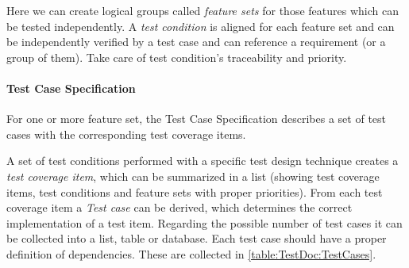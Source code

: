 Here we can create logical groups called \textit{feature sets} for those features which can be tested independently.  A \textit{test condition} is aligned for each feature set and can be independently verified by a test case and can reference a requirement (or a group of them). Take care of test condition's traceability and priority.

\paragraph{Test Case Specification}
For one or more feature set, the Test Case Specification describes a set of test cases with the corresponding test coverage items.

A set of test conditions performed with a specific test design technique creates a \textit{test coverage item}, which can be summarized in a list (showing test coverage items, test conditions and feature sets with proper priorities). From each test coverage item a \textit{Test case} can be derived, which determines the correct implementation of a test item. Regarding the possible number of test cases it can be collected into a list, table or database. 
Each test case should have a proper definition of dependencies. These are collected in \autoref{table:TestDoc:TestCases}.

